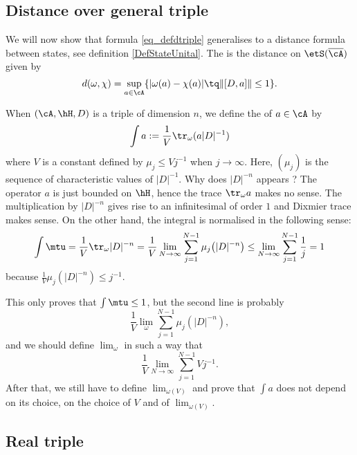 \subsection{Distance over general triple}

We will now show that formula \eqref{eq_defdtriple} generalises to a distance formula between states, see definition \ref{DefStateUnital}. The  is the distance on $\etS(\overline{ \cA })$ given by
\begin{equation}
d(\omega,\chi)=\sup_{a\in\cA}\{ | \omega(a)-\chi(a) |\tq \| [D,a] \|\leq 1 \}.
\end{equation}

When $(\cA,\hH,D)$ is a triple of dimension $n$, we define the  of $a\in \cA$ by
\begin{equation}
\int a:=\frac{1}{ V }\tr_{\omega}(a| D |^{-1})
\end{equation}
where $V$ is a constant defined by $\mu_j\leq V j^{-1}$ when $j\to\infty$. Here, $(\mu_j)$ is the sequence of characteristic values of $| D |^{-1}$. Why does $| D |^{-n}$ appears ? The operator $a$ is just bounded on $\hH$, hence the trace $\tr_{\omega}a$ makes no sense. The multiplication by $| D |^{-n}$ gives rise to an infinitesimal of order $1$ and Dixmier trace makes sense. On the other hand, the integral is normalised in the following sense:
\[ 
  \int\mtu=\frac{1}{ V }\tr_{\omega}| D |^{-n}
		=\frac{1}{ V }\lim_{N\to\infty}\sum_{j=1}^{N-1}\mu_j\big( | D |^{-n} \big)
		\leq\lim_{N\to\infty}\sum_{j=1}^{N-1}\frac{1}{ j }
		=1
\]
because $\frac{1}{ V }\mu_j(| D |^{-n})\leq j^{-1}$.

\begin{probleme}
	This only proves that $\int\mtu\leq1$, but the second line is probably
\[ 
  \frac{1}{ V }\lim_{\omega}\sum_{j=1}^{N-1}\mu_j(| D |^{-n}),
\]
and we should define $\lim_{\omega}$ in such a way that
\[ 
  \frac{1}{ V }\lim_{N\to\infty}\sum_{j=1}^{N-1}Vj^{-1}.
\]
After that, we still have to define $\lim_{\omega(V)}$ and prove that $\int a$ does not depend on its choice, on the choice of $V$ and of $\lim_{\omega(V)}$.
\end{probleme}

\subsection{Real triple}

